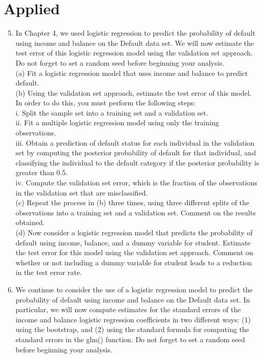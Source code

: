 \documentclass[10pt]{article}
\begin{document}
\section*{Applied}
\begin{enumerate}
  \setcounter{enumi}{4}
  \item In Chapter 4, we used logistic regression to predict the probability of default using income and balance on the Default data set. We will now estimate the test error of this logistic regression model using the validation set approach. Do not forget to set a random seed before beginning your analysis.\\
(a) Fit a logistic regression model that uses income and balance to predict default.\\
(b) Using the validation set approach, estimate the test error of this model. In order to do this, you must perform the following steps:\\
i. Split the sample set into a training set and a validation set.\\
ii. Fit a multiple logistic regression model using only the training observations.\\
iii. Obtain a prediction of default status for each individual in the validation set by computing the posterior probability of default for that individual, and classifying the individual to the default category if the posterior probability is greater than 0.5.\\
iv. Compute the validation set error, which is the fraction of the observations in the validation set that are misclassified.\\
(c) Repeat the process in (b) three times, using three different splits of the observations into a training set and a validation set. Comment on the results obtained.\\
(d) Now consider a logistic regression model that predicts the probability of default using income, balance, and a dummy variable for student. Estimate the test error for this model using the validation set approach. Comment on whether or not including a dummy variable for student leads to a reduction in the test error rate.
  \item We continue to consider the use of a logistic regression model to predict the probability of default using income and balance on the Default data set. In particular, we will now compute estimates for the standard errors of the income and balance logistic regression coefficients in two different ways: (1) using the bootstrap, and (2) using the standard formula for computing the standard errors in the glm() function. Do not forget to set a random seed before beginning your analysis.\\

\end{enumerate}
\end{document}
